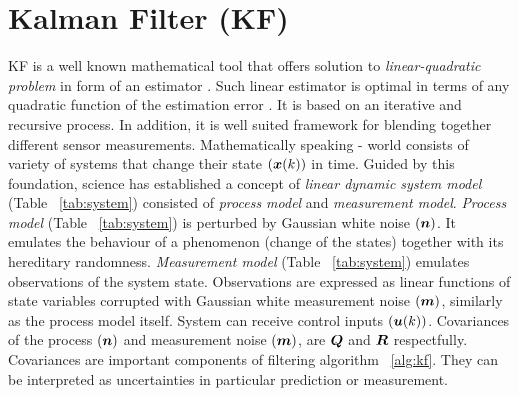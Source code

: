 \section{Kalman Filter (KF)} \label{sec:kf} 
KF \cite{kalman60}  is a well known mathematical tool that offers solution to \textit{linear-quadratic problem} in form of an estimator \cite{grewal01,ristic04}. Such linear estimator is optimal in terms of any quadratic function of the estimation error \cite{grewal01}. It is based on an iterative and recursive process. In addition, it is well suited framework for blending together different sensor measurements. Mathematically speaking - world consists of variety of systems that change their state $(\boldsymbol{x}(k))$ in time. Guided by this foundation, science has established a concept of \textit{linear dynamic system model} (Table ~\ref{tab:system}) consisted of \textit{process model} and \textit{measurement model}. \textit{Process model} (Table ~\ref{tab:system}) is perturbed by Gaussian white noise $(\boldsymbol{n})$. It emulates the behaviour of a phenomenon (change of the states) together with its hereditary randomness. \textit{Measurement model} (Table ~\ref{tab:system}) emulates observations of the system state. Observations are expressed as linear functions of state variables corrupted with Gaussian white measurement noise $(\boldsymbol{m})$, similarly as the process model itself. System can receive control inputs $(\boldsymbol{u}(k))$. Covariances of the process $(\boldsymbol{n})$ and measurement noise $(\boldsymbol{m})$, are $\boldsymbol{Q}$ and $\boldsymbol{R}$ respectfully. Covariances are important components of filtering algorithm ~\ref{alg:kf}. They can be interpreted as uncertainties in particular prediction or measurement.
